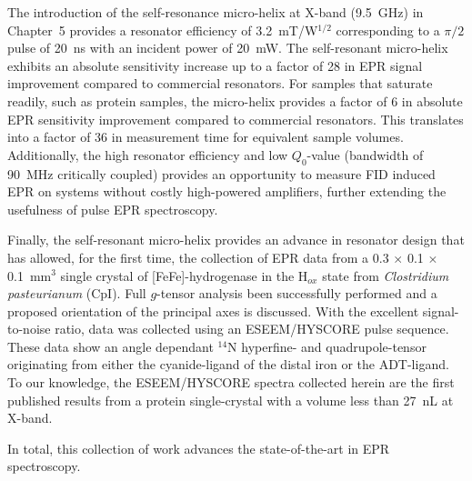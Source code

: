 The introduction of the self-resonance micro-helix at X-band (9.5~GHz) in Chapter~5 provides a resonator efficiency of 3.2~mT/W$^{1/2}$ corresponding to a $\pi/2$ pulse of 20~ns with an incident power of 20~mW. The self-resonant micro-helix exhibits an absolute sensitivity increase up to a factor of 28 in EPR signal improvement compared to commercial resonators. For samples that saturate readily, such as protein samples, the micro-helix provides a factor of 6 in absolute EPR sensitivity improvement compared to commercial resonators. This translates into a factor of 36 in measurement time for equivalent sample volumes. Additionally, the high resonator efficiency and low $Q_0$-value (bandwidth of 90~MHz critically coupled) provides an opportunity to measure FID induced EPR on systems without costly high-powered amplifiers, further extending the usefulness of pulse EPR spectroscopy.

Finally, the self-resonant micro-helix provides an advance in resonator design that has allowed, for the first time, the collection of EPR data from a 0.3 $\times$ 0.1 $\times$ 0.1~mm$^3$ single crystal of [FeFe]-hydrogenase in the H$_{ox}$ state from {\em Clostridium pasteurianum} (CpI). Full $g$-tensor analysis been successfully performed and a proposed orientation of the principal axes is discussed. With the excellent signal-to-noise ratio, data was collected using an ESEEM/HYSCORE pulse sequence. These data show an angle dependant $^{14}$N hyperfine- and quadrupole-tensor originating from either the cyanide-ligand of the distal iron or the ADT-ligand.  To our knowledge, the ESEEM/HYSCORE spectra collected herein are the first published results from a protein single-crystal with a volume less than 27~nL at X-band. 

In total, this collection of work advances the state-of-the-art in EPR spectroscopy.


{\renewcommand{\bibsection}{\clearpage\section*{\bibname}\markboth{\bibname}{\bibname}}
\renewcommand{\bibname}{REFERENCES}


}